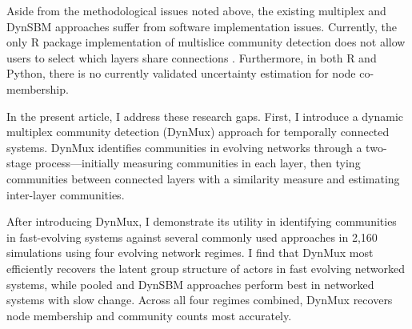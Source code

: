 \documentclass[11pt, letterpaper]{article}
\begin{document}
Aside from the methodological issues noted above, the existing multiplex and DynSBM approaches suffer from software implementation issues. Currently, the only R package implementation of multislice community detection does not allow users to select which layers share connections \citep{magnani2021analysis}. %
Furthermore, in both R and Python, there is no currently validated uncertainty estimation for node co-membership.

In the present article, I address these research gaps. First, I introduce a dynamic multiplex community detection (DynMux) approach for temporally connected systems. DynMux identifies communities in evolving networks through a two-stage process---initially measuring communities in each layer, then tying communities between connected layers with a similarity measure and estimating inter-layer communities.

After introducing DynMux, I demonstrate its utility in identifying communities in fast-evolving  systems against several commonly used approaches in 2,160 simulations using four evolving network regimes. %
I find that DynMux most efficiently recovers the latent group structure of actors in fast evolving networked systems, while pooled and DynSBM approaches perform best in networked systems with slow change. Across all four regimes combined, DynMux recovers node membership and community counts most accurately.%
\end{document}
